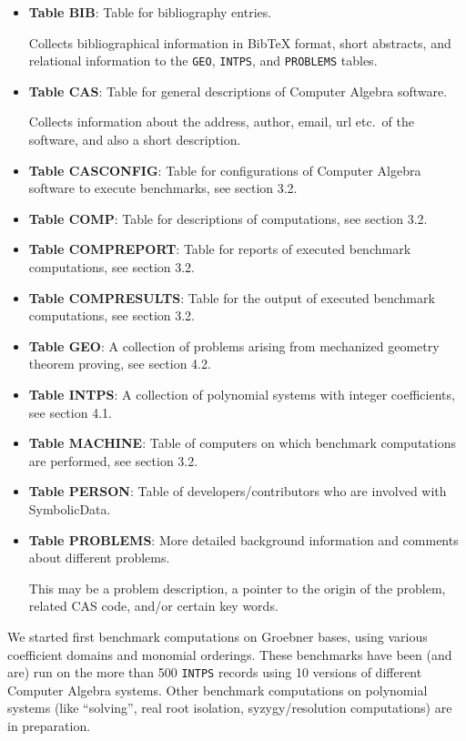 \documentclass[11pt,a4paper]{article}
\newcommand{\SD}{{\sc Symbolic\-Data}}
\begin{document}
\begin{itemize}
\item {\bf Table BIB}: Table for bibliography entries. 

Collects bibliographical information in BibTeX format, short
abstracts, and relational information to the {\tt GEO}, {\tt INTPS},
and {\tt PROBLEMS} tables.

\item {\bf Table CAS}: Table for general descriptions of Computer
Algebra software.

Collects information about the address, author, email, url etc.\ of
the software, and also a short description.

\item {\bf Table CASCONFIG}: Table for configurations of Computer
Algebra software to execute benchmarks, see section 3.2.

\item {\bf Table COMP}: Table for descriptions of computations, see
section 3.2.

\item {\bf Table COMPREPORT}: Table for reports of executed benchmark
computations, see section 3.2.

\item {\bf Table COMPRESULTS}: Table for the output of executed
benchmark computations, see section 3.2.

\item {\bf Table GEO}: A collection of problems arising from mechanized
geometry theorem proving, see section 4.2.

\item {\bf Table INTPS}: A collection of polynomial systems with
integer coefficients, see section 4.1.

\item {\bf Table MACHINE}: Table of computers on which benchmark
computations are performed, see section 3.2.

\item {\bf Table PERSON}: Table of developers/contributors who are
involved with \SD.

\item {\bf Table PROBLEMS}: More detailed background information and
comments about different problems.

This may be a problem description, a pointer to the origin of the
problem, related CAS code, and/or certain key words.
\end{itemize}

We started first benchmark computations on Groebner bases, using
various coefficient domains and monomial orderings.  These benchmarks
have been (and are) run on the more than 500 {\tt INTPS} records using
10 versions of different Computer Algebra systems. Other benchmark
computations on polynomial systems (like ``solving'', real root
isolation, syzygy/resolution computations) are in preparation.
\end{document}
